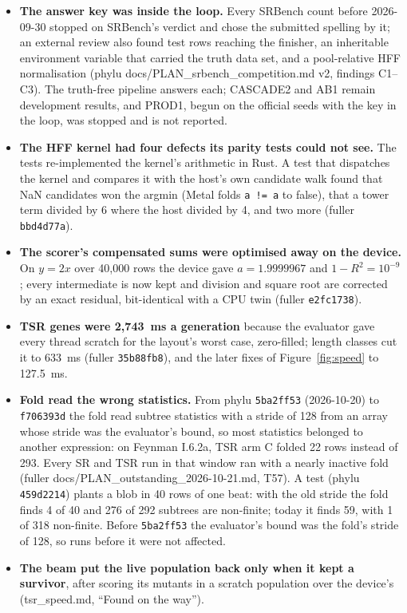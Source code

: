 \documentclass[sigconf,nonacm]{acmart}
\newcommand{\src}[1]{{\small\ttfamily #1}}
\begin{document}
\begin{itemize}
\item \textbf{The answer key was inside the loop.} Every SRBench count before
2026-09-30 stopped on SRBench's verdict and chose the submitted spelling by
it; an external review also found test rows reaching the finisher, an
inheritable environment variable that carried the truth data set, and a
pool-relative HFF normalisation (\src{phylu
docs/\allowbreak{}PLAN\_\allowbreak{}srbench\_\allowbreak{}competition.\allowbreak{}md} v2, findings C1--C3). The truth-free
pipeline answers each; CASCADE2 and AB1 remain development results, and PROD1,
begun on the official seeds with the key in the loop, was stopped and is not
reported.
\item \textbf{The HFF kernel had four defects its parity tests could not see.}
The tests re-implemented the kernel's arithmetic in Rust. A test that dispatches
the kernel and compares it with the host's own candidate walk found that NaN
candidates won the argmin (Metal folds \texttt{a != a} to false), that a tower
term divided by 6 where the host divided by 4, and two more (fuller
\texttt{bbd4d77a}).
\item \textbf{The scorer's compensated sums were optimised away on the
device.} On $y=2x$ over 40{,}000 rows the device gave $a=1.9999967$ and
$1-R^2=10^{-9}$; every intermediate is now kept and division and square root are
corrected by an exact residual, bit-identical with a CPU twin (fuller
\texttt{e2fc1738}).
\item \textbf{TSR genes were 2{,}743~ms a generation} because the evaluator
gave every thread scratch for the layout's worst case, zero-filled; length
classes cut it to 633~ms (fuller \texttt{35b88fb8}), and the later fixes of
Figure~\ref{fig:speed} to 127.5~ms.
\item \textbf{Fold read the wrong statistics.} From phylu \texttt{5ba2ff53}
(2026-10-20) to \texttt{f706393d} the fold read subtree statistics with a
stride of 128 from an array whose stride was the evaluator's bound, so most
statistics belonged to another expression: on Feynman I.6.2a, TSR arm C folded
22 rows instead of 293. Every SR and TSR run in that window ran with a nearly
inactive fold (\src{fuller docs/\allowbreak{}PLAN\_\allowbreak{}outstanding\_\allowbreak{}2026-10-21.\allowbreak{}md}, T57). A test
(phylu \texttt{459d2214}) plants a blob in 40 rows of one beat: with the old
stride the fold finds 4 of 40 and 276 of 292 subtrees are non-finite; today it
finds 59, with 1 of 318 non-finite. Before \texttt{5ba2ff53} the evaluator's
bound was the fold's stride of 128, so runs before it were not affected.
\item \textbf{The beam put the live population back only when it kept a
survivor}, after scoring its mutants in a scratch population over the device's
(\src{tsr\_\allowbreak{}speed.\allowbreak{}md}, ``Found on the way'').
\end{itemize}
\end{document}
